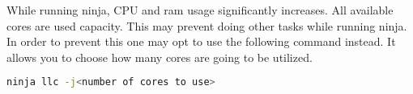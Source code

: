 While running ninja, CPU and ram usage significantly increases. All available cores are used capacity. This may prevent doing other tasks while running ninja. In order to prevent this one may opt to use the following command instead. It allows you to choose how many cores are going to be utilized.
\begin{lstlisting}[language=Bash]
	ninja llc -j<number of cores to use>
\end{lstlisting}





\newpage

